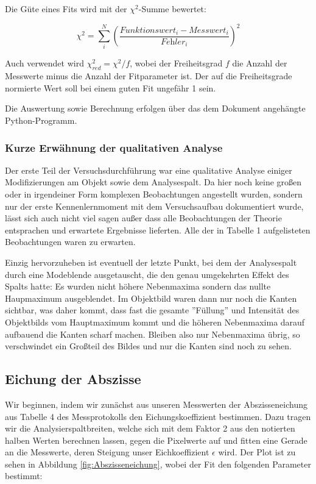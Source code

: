 \documentclass{article}
\begin{document}
Die Güte eines Fits wird mit der $\chi^2$-Summe bewertet:

\begin{equation}
    \chi^2 = \sum_i^N \left( \frac{\textit{Funktionswert}_i - \textit{Messwert}_i}{\textit{Fehler}_i} \right)^2
\end{equation}

Auch verwendet wird $\chi^2_{red} = \chi^2 / f$, wobei der Freiheitsgrad $f$ die Anzahl der Messwerte minus die Anzahl der Fitparameter ist. Der auf die Freiheitsgrade normierte Wert soll bei einem guten Fit ungefähr 1 sein.

Die Auswertung sowie Berechnung erfolgen über das dem Dokument angehängte Python-Programm.

\newpage
\subsubsection{Kurze Erwähnung der qualitativen Analyse}

Der erste Teil der Versuchsdurchführung war eine qualitative Analyse einiger Modifizierungen am Objekt sowie dem Analysespalt. Da hier noch keine großen oder in irgendeiner Form komplexen Beobachtungen angestellt wurden, sondern nur der erste Kennenlernmoment mit dem Versuchsaufbau dokumentiert wurde, lässt sich auch nicht viel sagen außer dass alle Beobachtungen der Theorie entsprachen und erwartete Ergebnisse lieferten. Alle der in Tabelle 1 aufgelisteten Beobachtungen waren zu erwarten. 

Einzig hervorzuheben ist eventuell der letzte Punkt, bei dem der Analysespalt durch eine Modeblende ausgetauscht, die den genau umgekehrten Effekt des Spalts hatte: Es wurden nicht höhere Nebenmaxima sondern das nullte Haupmaximum ausgeblendet. Im Objektbild waren dann nur noch die Kanten sichtbar, was daher kommt, dass fast die gesamte ''Füllung'' und Intensität des Objektbilds vom Hauptmaximum kommt und die höheren Nebenmaxima darauf aufbauend die Kanten scharf machen. Bleiben also nur Nebenmaxima übrig, so verschwindet ein Großteil des Bildes und nur die Kanten sind noch zu sehen. 

\newpage

\subsection{Eichung der Abszisse}

Wir beginnen, indem wir zunächst aus unseren Messwerten der Abszisseneichung aus Tabelle 4 des Messprotokolls den Eichungskoeffizient bestimmen. Dazu tragen wir die Analysierspaltbreiten, welche sich mit dem Faktor 2 aus den notierten halben Werten berechnen lassen, gegen die Pixelwerte auf und fitten eine Gerade an die Messwerte, deren Steigung unser Eichkoeffizient $\epsilon$ wird. Der Plot ist zu sehen in Abbildung \ref{fig:Abszisseneichung}, wobei der Fit den folgenden Parameter bestimmt:
\end{document}
